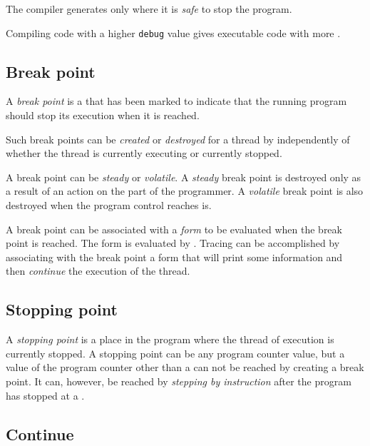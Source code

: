 The compiler generates \pollpoints{} only where it is \emph{safe} to
stop the program.

Compiling code with a higher \texttt{debug} value gives executable
code with more \pollpoints{}.

%
\def\Breakpoint{Break point}%
\def\breakpoint{break point}%
\def\breakpoints{break points}%
\subsection{\Breakpoint{}}

A \emph{\breakpoint{}} is a \pollpoint{} that has been marked to indicate
that the running program should stop its execution when it is
reached.

Such \breakpoints{} can be \emph{created} or \emph{destroyed} for a
thread by \sysname{} independently of whether the thread is currently
executing or currently stopped.

A \breakpoint{} can be \emph{steady} or \emph{volatile}.  A
\emph{steady} \breakpoint{} is destroyed only as a result of an action
on the part of the programmer.  A \emph{volatile} \breakpoint{} is
also destroyed when the program control reaches is.

A \breakpoint{} can be associated with a \commonlisp{} \emph{form} to
be evaluated when the \breakpoint{} is reached.  The form is evaluated
by \sysname{}.  Tracing can be accomplished by associating with the
\breakpoint{} a form that will print some information and then
\emph{continue} the execution of the thread.

%
\def\Stoppingpoint{Stopping point}%
\def\stoppingpoint{stopping point}%
\def\stoppingpoints{stopping points}%
\subsection{\Stoppingpoint{}}

A \emph{\stoppingpoint{}} is a place in the program where the thread
of execution is currently stopped.  A \stoppingpoint{} can be any
program counter value, but a value of the program counter other than
a \pollpoint{} can not be reached by creating a \breakpoint{}.  It
can, however, be reached by \emph{stepping by instruction} after the
program has stopped at a \pollpoint{}.

%
\def\Continue{Continue}%
\def\continue{continue}%
\def\continues{continues}%
\subsection{\Continue{}}

